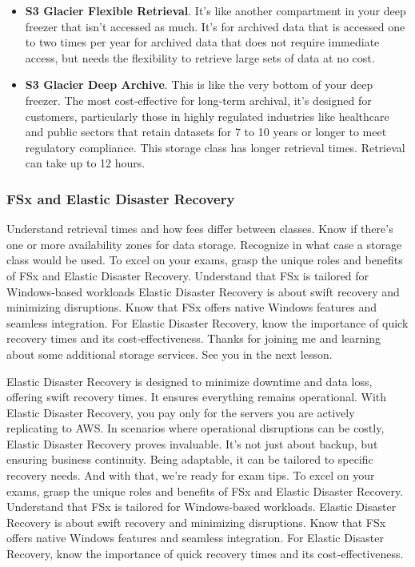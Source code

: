 \begin{itemize}
    \item \textbf{S3 Glacier Flexible Retrieval}. It's like another compartment in your deep freezer that isn't accessed as much. It's for archived data that is accessed one to two times per year for archived data that does not require immediate access, but needs the flexibility to retrieve large sets of data at no cost.
    \item \textbf{S3 Glacier Deep Archive}. This is like the very bottom of your deep freezer. The most cost‑effective for long‑term archival, it's designed for customers, particularly those in highly regulated industries like healthcare and public sectors that retain datasets for 7 to 10 years or longer to meet regulatory compliance. This storage class has longer retrieval times. Retrieval can take up to 12 hours.
\end{itemize}

\subsubsection{FSx and Elastic Disaster Recovery}

Understand retrieval times and how fees differ between classes.
Know if there's one or more availability zones for data storage.
Recognize in what case a storage class would be used.
To excel on your exams, grasp the unique
roles and benefits of FSx and Elastic Disaster Recovery.
Understand that FSx is tailored for Windows‑based workloads
Elastic Disaster Recovery is about swift recovery and minimizing disruptions.
Know that FSx offers native Windows features and seamless
integration. For Elastic Disaster Recovery, know the importance of
quick recovery times and its cost‑effectiveness.
Thanks for joining me and learning about some additional storage services. See you in the next lesson.

Elastic Disaster Recovery is designed to minimize downtime and
data loss, offering swift recovery times.
It ensures everything remains operational. With Elastic Disaster
Recovery, you pay only for the servers you are actively replicating to
AWS. In scenarios where operational disruptions can be costly, Elastic
Disaster Recovery proves invaluable.
It's not just about backup, but ensuring business continuity. Being adaptable,
it can be tailored to specific recovery needs.
And with that,
we're ready for exam tips. To excel on your exams, grasp the unique
roles and benefits of FSx and Elastic Disaster Recovery.
Understand that FSx is tailored for Windows‑based workloads.
Elastic Disaster Recovery is about swift recovery and minimizing disruptions.
Know that FSx offers native Windows features and seamless
integration. For Elastic Disaster Recovery, know the importance of
quick recovery times and its cost‑effectiveness.

